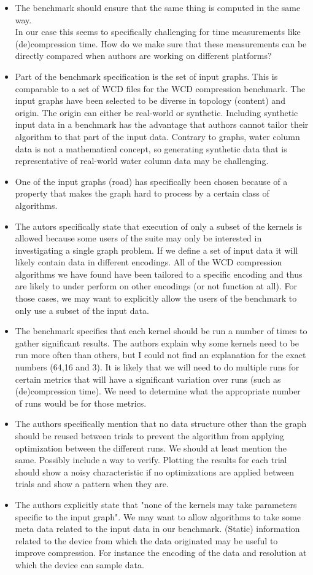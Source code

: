 \begin{itemize}
\item The benchmark should ensure that the same thing is computed in the same way. \\
In our case this seems to specifically challenging for time measurements like (de)compression time. How do we make sure that these measurements can be directly compared when authors are working on different platforms?
\item Part of the benchmark specification is the set of input graphs. This is comparable to a set of WCD files for the WCD compression benchmark. The input graphs have been selected to be diverse in topology (content) and origin. The origin can either be real-world or synthetic. Including synthetic input data in a benchmark has the advantage that authors cannot tailor their algorithm to that part of the input data. Contrary to graphs, water column data is not a mathematical concept, so generating synthetic data that is representative of real-world water column data may be challenging.
\item One of the input graphs (road) has specifically been chosen because of a property that makes the graph hard to process by a certain class of algorithms.
\item The autors specifically state that execution of only a subset of the kernels is allowed because some users of the suite may only be interested in investigating a single graph problem. If we define a set of input data it will likely contain data in different encodings. All of the WCD compression algorithms we have found have been tailored to a specific encoding and thus are likely to under perform on  other encodings (or not function at all). For those cases, we may want to explicitly allow the users of the benchmark to only use a subset of the input data. 
\item The benchmark specifies that each kernel should be run a number of times to gather significant results. The authors explain why some kernels need to be run more often than others, but I could not find an explanation for the exact numbers (64,16 and 3). It is likely that we will need to do multiple runs for certain metrics that will have a significant variation over runs (such as (de)compression time). We need to determine what the appropriate number of runs would be for those metrics.
\item The authors specifically mention that no data structure other than the graph should be reused between trials to prevent the algorithm from applying optimization between the different runs. We should at least mention the same. Possibly include a way to verify. Plotting the results for each trial should show a noisy characteristic if no optimizations are applied between trials and show a pattern when they are.
\item The authors explicitly state that "none of the kernels may take parameters specific to the input graph". We may want to allow algorithms to take some meta data related to the input data in our benchmark. (Static) information related to the device from which the data originated may be useful to improve compression. For instance the encoding of the data and resolution at which the device can sample data. 
\end{itemize}